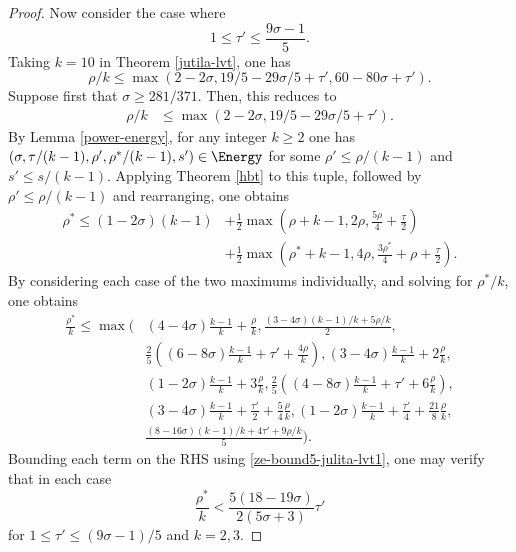 \begin{proof}
Now consider the case where
\[
1 \le \tau' \le \frac{9\sigma - 1}{5}.
\]
Taking $k = 10$ in Theorem \ref{jutila-lvt}, one has
\begin{equation}\label{ze-bound5-julita-lvt}
\rho/k \le \max(2 - 2\sigma,  19/5 - 29\sigma/5 + \tau', 60 - 80\sigma + \tau').
\end{equation}
Suppose first that $\sigma \ge 281/371$. Then, this reduces to
\begin{equation}
\label{ze-bound5-julita-lvt1}
\begin{split}
\rho/k &\le \max(2 - 2\sigma, 19/5 - 29\sigma/5 + \tau').
\end{split}
\end{equation}
By Lemma \ref{power-energy}, for any integer $k \ge 2$ one has $(\sigma, \tau/(k - 1), \rho', \rho^*/(k - 1), s') \in \Energy$ for some $\rho' \le \rho/(k - 1)$ and $s' \le s/(k - 1)$. Applying Theorem \ref{hbt} to this tuple, followed by $\rho' \le \rho/(k - 1)$ and rearranging, one obtains
\begin{equation}\label{ze-bound5-rhostar-bound}
\begin{split}
\rho^* \le (1-2\sigma)(k - 1) &+ \frac{1}{2}\max(\rho+k - 1, 2\rho, \frac{5\rho}{4} + \frac{\tau}{2}) \\
&+ \frac{1}{2}\max(\rho^*+k - 1, 4\rho, \frac{3\rho^*}{4} + \rho+\frac{\tau}{2}).
\end{split}
\end{equation}
By considering each case of the two maximums individually, and solving for $\rho^*/k$, one obtains
\begin{equation}\label{ze-bound5-rhostar-bound3}
\begin{split}
\frac{\rho^*}{k} \le \max\bigg(&(4 - 4\sigma)\frac{k - 1}{k} + \frac{\rho}{k}, \frac{(3 - 4\sigma)(k - 1)/k + 5\rho/k}{2}, \\
&\frac{2}{5}((6 - 8\sigma)\frac{k - 1}{k} + \tau' + \frac{4\rho}{k}), (3 - 4\sigma)\frac{k - 1}{k} + 2\frac{\rho}{k}, \\
&(1 - 2\sigma)\frac{k - 1}{k} + 3\frac{\rho}{k}, \frac{2}{5}((4 - 8\sigma)\frac{k - 1}{k} + \tau' + 6\frac{\rho}{k}),\\
&(3 - 4\sigma)\frac{k - 1}{k} + \frac{\tau'}{2} + \frac{5}{4}\frac{\rho}{k}, (1 - 2\sigma)\frac{k - 1}{k} + \frac{\tau'}{4} + \frac{21}{8}\frac{\rho}{k}, \\
&\frac{(8 - 16\sigma)(k - 1)/k + 4\tau' + 9\rho/k}{5}\bigg).
\end{split}
\end{equation}
Bounding each term on the RHS using \eqref{ze-bound5-julita-lvt1}, one may verify that in each case
\[
\frac{\rho^*}{k} < \frac{5(18 - 19\sigma)}{2(5\sigma + 3)}\tau'
\]
for $1 \le \tau' \le (9\sigma - 1)/5$ and $k = 2,3$.


\end{proof}
